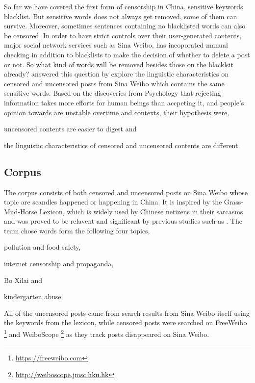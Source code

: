 \documentclass[11pt]{article} %
\begin{document}
So far we have covered the first form of censorship in China, sensitive keywords blacklist. But sensitive words does not always get removed, some of them can survive. Moreover, sometimes sentences containing no blacklisted words can also be censored. In order to have strict controls over their user-generated contents, major social network services such as Sina Weibo, has incoporated manual checking in addition to blacklists to make the decision of whether to delete a post or not. So what kind of words will be removed besides those on the blacklsit already? \cite{ng2018linguistic} answered this question by explore the linguistic characteristics on censored and uncensored posts from Sina Weibo which contains the same sensitive words. Based on the discoveries from Psychology that rejecting information takes more efforts for human beings than accpeting it\cite{lewandowsky2012misinformation}, and people's opinion towards are unstable overtime and contexts\cite{xu2008thinking}, their hypothesis were, \begin {enumerate*}[label=\emph{\alph*})]
\item uncensored contents are easier to digest and \item the linguistic characteristics of censored and uncensored contents are different. 
\end {enumerate*}

\subsection{Corpus}

The corpus consists of both censored and uncensored posts on Sina Weibo whose topic are scandles happened or happening in China. It is inspired by the Grass-Mud-Horse Lexicon, which is widely used by Chinese netizens in their sarcasms and was proved to be relavent and significant by previous studies such as \cite{tang2011symbolic} \cite{wang2012china}. The team chose words form the following four topics,
\begin {enumerate*}[label=\emph{\alph*})]
\item pollution and food safety, \item internet censorship and propaganda, \item Bo Xilai and \item kindergarten abuse.
\end {enumerate*}
All of the uncensored posts came from search results from Sina Weibo itself using the keywords from the lexicon, while censored posts were searched on FreeWeibo \footnote{\url{https://freeweibo.com}} and WeiboScope \footnote{\url{http://weiboscope.jmsc.hku.hk}} as they track posts disappeared on Sina Weibo.
\end{document}
